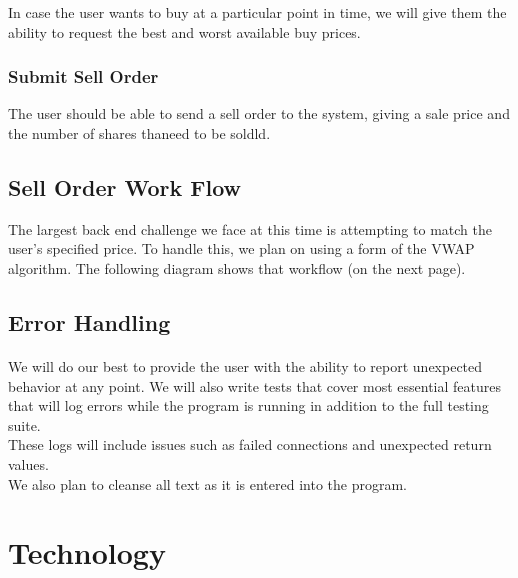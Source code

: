 \documentclass{article}
\begin{document}
In case the user wants to buy at a particular point in time, we will give them the ability to request the best and worst available buy prices. 

\subsubsection{Submit Sell Order}

The user should be able to send a sell order to the system, giving a sale price and the number of shares thaneed to be soldld.

\subsection{Sell Order Work Flow}

The largest back end challenge we face at this time is attempting to match the user's specified price. To handle this, we plan on using a form of the VWAP algorithm. The following diagram shows that workflow (on the next page).

\begin{figure}
   \centering
   
\end{figure}

\pagebreak
\subsection{Error Handling}

\paragraph{}

We will do our best to provide the user with the ability to report unexpected behavior at any point. We will also write tests that cover most essential features that will log errors while the program is running in addition to the full testing suite.\\

These logs will include issues such as failed connections and unexpected return values.\\

We also plan to cleanse all text as it is entered into the program.

\section{Technology}
\end{document}
